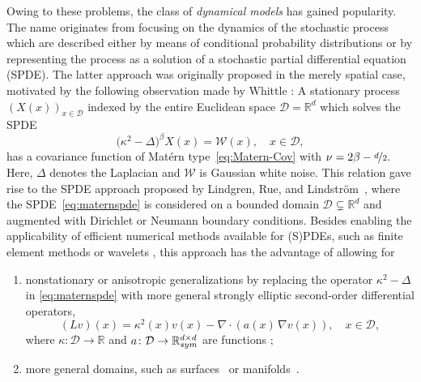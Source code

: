 \documentclass[reqno]{amsart}
\numberwithin{equation}{section}
\newcommand{\bbR}{\mathbb{R}}
\newcommand{\cD}{\mathcal{D}}
\newcommand{\cW}{\mathcal{W}}
\newcommand{\from}{\colon}
\theoremstyle{remark}
\theoremstyle{definition}
\begin{document}
Owing to these problems, 
the class of \emph{dynamical models} has 
gained popularity. 
The name originates from focusing on 
the dynamics of the stochastic process 
which are described 
either 
by means of 
conditional probability distributions 
or by representing 
the process as a solution 
of a stochastic partial differential equation (SPDE). 
%
The latter approach 
was originally proposed in the merely spatial case,  
motivated by the following observation made by 
Whittle \cite{Whittle1963}: 
A stationary process $(X(x))_{x\in\cD}$ 
indexed by the entire 
Euclidean space $\cD=\bbR^d$ 
which solves the 
SPDE 
%
\begin{equation}\label{eq:maternspde}
\bigl( \kappa^2-\Delta\bigr)^\beta X(x) 
= \cW(x), 
\quad 
x\in\cD, 
\end{equation}
% 
has a covariance function 
of Mat\'ern type~\eqref{eq:Matern-Cov} 
with $\nu = 2\beta - \nicefrac{d}{2}$. 
% 
Here, 
$\Delta$ denotes the
Laplacian and $\cW$ is Gaussian white noise.  
% 
This relation gave rise to the SPDE approach
proposed by Lindgren, Rue, and Lindstr\"om~\cite{Lindgren2011explicit},  
where 
the SPDE~\eqref{eq:maternspde} is considered 
on a bounded domain $\cD\subsetneq\bbR^d$ 
and augmented with Dirichlet or Neumann boundary conditions.  
%
Besides enabling the applicability of efficient numerical 
methods available for (S)PDEs,  
such as 
finite element methods 
\cite{Bolin2020rational, Bolin2018weak, Bolin2020strong, 
	Cox2020regularity, Herrmann2020, Lindgren2011explicit} 
or wavelets \cite{Bolin2013wavelets, Harbrecht2021multilevel}, 
this approach has the 
advantage of allowing for 
% 
\begin{enumerate}[label={(\alph*)}, leftmargin=1cm,topsep=1mm] 
	\item 
	nonstationary or anisotropic generalizations 
	by replacing the operator 
	$\kappa^2-\Delta$ 
	in \eqref{eq:maternspde} 
	with more general  
	strongly elliptic 
	second-order 
	differential operators, 
	\begin{equation}\label{eq:DO} 
	(L v)(x)
	= 
	\kappa^2(x) v(x)  
	- \nabla \cdot ( a(x) \, \nabla v(x) ), 
	\quad 
	x \in \cD, 
	\end{equation}
	where $\kappa\from \cD\to\bbR$ and  
	$a\from\cD\to\bbR_{\rm sym}^{d\times d}$ 
	are functions   
	\cite{Bakka2019nonstationary, 
		Bolin2020rational, Bolin2018weak, Bolin2020strong, 
		Cox2020regularity, 
		Fuglstad2015, Herrmann2020, Lindgren2011explicit}; 
	\item 
	more general domains,  
	such as surfaces~\cite{Bolin2011ozone, Herrmann2020} 
	or manifolds~\cite{Harbrecht2021multilevel}. 
\end{enumerate} 
\end{document}

